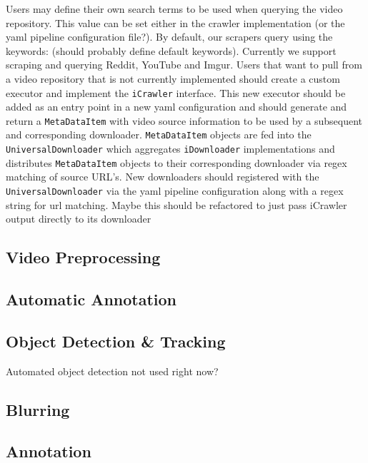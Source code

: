 \documentclass[letterpaper, 10 pt, conference]{IEEEconf}
\newcommand{\todo}[1]{{\color{red}#1}}
\begin{document}
Users may define their own search terms to be used when querying the video repository. This value can be set either in the crawler implementation (\todo{or the yaml pipeline configuration file?}). By default, our scrapers query using the keywords: (\todo{should probably define default keywords}). Currently we support scraping and querying Reddit, YouTube and Imgur. Users that want to pull from a video repository that is not currently implemented should create a custom executor and implement the \texttt{iCrawler} interface. This new executor should be added as an entry point in a new yaml configuration and should generate and return a \texttt{MetaDataItem} with video source information to be used by a subsequent and corresponding downloader. \texttt{MetaDataItem} objects are fed into the \texttt{UniversalDownloader} which aggregates \texttt{iDownloader} implementations and distributes \texttt{MetaDataItem} objects to their corresponding downloader via regex matching of source URL's. New downloaders should registered with the \texttt{UniversalDownloader} via the yaml pipeline configuration along with a regex string for url matching.  \todo{Maybe this should be refactored to just pass iCrawler output directly to its downloader}

\subsection{Video Preprocessing}



\subsection{Automatic Annotation}
\subsection{Object Detection \& Tracking}
\todo{Automated object detection not used right now?}
\subsection{Blurring}
\subsection{Annotation}
\end{document}
